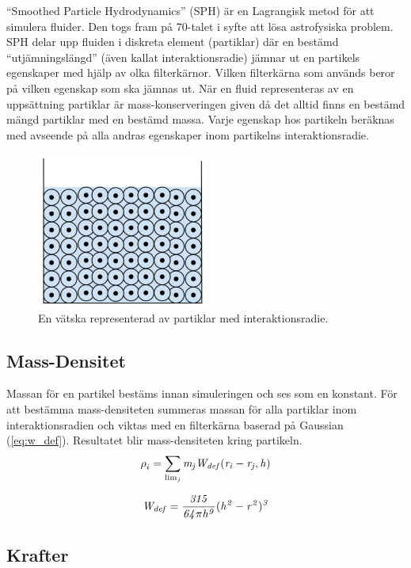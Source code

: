 \documentclass[a4paper,12pt,oneside,final]{extarticle}
\begin{document}
“Smoothed Particle Hydrodynamics” (SPH)\cite{sph} är en Lagrangisk metod för att simulera fluider.
Den togs fram på 70-talet i syfte att lösa astrofysiska problem.
SPH delar upp fluiden i diskreta element (partiklar) där en bestämd “utjämningslängd” (även kallat interaktionsradie) jämnar ut en partikels egenskaper med hjälp av olka filterkärnor.
Vilken filterkärna som används beror på vilken egenskap som ska jämnas ut.
När en fluid representeras av en uppsättning partiklar är mass-konserveringen given då det alltid finns en bestämd mängd partiklar med en bestämd massa.
Varje egenskap hos partikeln beräknas med avseende på alla andras egenskaper inom partikelns interaktionsradie.
\begin{figure}[H]
  \centering
    \includegraphics[width=0.5\textwidth]{bilder/partiklar_vila}
  \caption{En vätska representerad av partiklar med interaktionsradie.}
\end{figure}

\subsection{Mass-Densitet}
Massan för en partikel bestäms innan simuleringen och ses som en konstant.
För att bestämma mass-densiteten summeras massan för alla partiklar inom interaktionsradien och viktas med en filterkärna baserad på Gaussian (\ref{eq:w_def}).
Resultatet blir mass-densiteten kring partikeln.
\begin{equation}
\rho^{}_{i} = \sum_{\lim_{j}} {\it m_j W_{def} (r_i-r_j,h)}
\end{equation}

\begin{equation} \label{eq:w_def}
{\it W_{def} = \frac{315}{64 \pi h^9}(h^2-r^2)^3}
\end{equation}

\subsection{Krafter}
\end{document}
